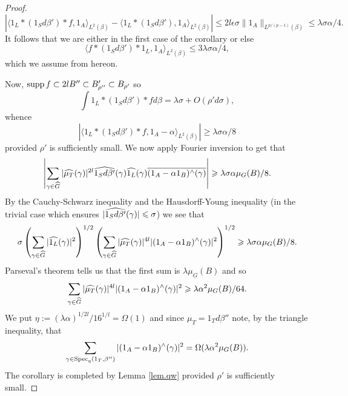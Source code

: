 \documentclass[12pt]{amsart}  %
\begin{document}
\begin{proof}
\begin{equation*}
|\langle 1_L \ast (1_S d\beta') \ast f ,1_{A}\rangle_{L^2(\beta)} - \langle 1_L\ast (1_Sd\beta') ,1_{A}\rangle_{L^2(\beta)}| \leq 2l\epsilon\sigma \|1_{A}\|_{L^{p/(p-1)}(\beta)} \leq \lambda\sigma \alpha/4.
\end{equation*}
It follows that we are either in the first case of the corollary or else
\begin{equation*}
\langle f \ast (1_Sd\beta') \ast 1_L ,1_{A}\rangle_{L^2(\beta)} \leq 3\lambda\sigma\alpha/4,
\end{equation*}
which we assume from hereon.

Now, $\mathop{\rm supp}\nolimits f \subset 2lB'' \subset B_{\rho''}'\subset B_{\rho'}$ so
\begin{equation*}
\int{1_L \ast (1_S d\beta') \ast fd\beta} = \lambda \sigma + O({\rho'} d\sigma ),
\end{equation*}
whence
\begin{equation*}
|\langle 1_L\ast(1_Sd\beta') \ast f ,1_{A}-\alpha \rangle_{L^2(\beta)}| \geq \lambda \sigma\alpha/8
\end{equation*}
provided ${\rho'}$ is sufficiently small.  We now apply Fourier inversion to get that
\begin{equation*}
\left|\sum_{\gamma \in \widehat{G}}{|\widehat{\mu_T}(\gamma)|^{2l}\widehat{1_Sd\beta'}(\gamma)\widehat{1_L}(\gamma)\overline{(1_{A} - \alpha 1_B)^\wedge(\gamma)}}\right| \geqslant \lambda \sigma \alpha \mu_G(B)/8.
\end{equation*}
By the Cauchy-Schwarz inequality and the Hausdorff-Young inequality (in the trivial case which ensures $|\widehat{1_Sd\beta'}(\gamma)| \leqslant \sigma$) we see that
\begin{equation*}
\sigma \left(\sum_{\gamma \in \widehat{G}}{|\widehat{1_L}(\gamma)|^2}\right)^{1/2}\left(\sum_{\gamma \in \widehat{G}}{|\widehat{\mu_T}(\gamma)|^{4l}|(1_{A} - \alpha 1_B)^\wedge(\gamma)|^2}\right)^{1/2} \geqslant \lambda\sigma \alpha \mu_G(B)/8.
\end{equation*}
Parseval's theorem tells us that the first sum is $\lambda\mu_G(B)$ and so
\begin{equation*}
\sum_{\gamma \in \widehat{G}}{|\widehat{\mu_T}(\gamma)|^{4l}|(1_{A} - \alpha 1_B)^\wedge(\gamma)|^2}\geqslant \lambda\alpha^2 \mu_G(B)/64.
\end{equation*}
We put $\eta:=(\lambda \alpha)^{1/2l}/16^{1/l}=\Omega(1)$ and since $\mu_T = 1_Td\beta''$ note, by the triangle inequality, that
\begin{equation*}
\sum_{\gamma \in  \mathop{\rm Spec}\nolimits_\eta(1_T,\beta'')}{|(1_{A} - \alpha 1_B)^\wedge(\gamma)|^2}=\Omega( \lambda\alpha^2 \mu_G(B)).
\end{equation*}
The corollary is completed by Lemma \ref{lem.qw} provided ${\rho'}$ is sufficiently small.
\end{proof}
\end{document}
